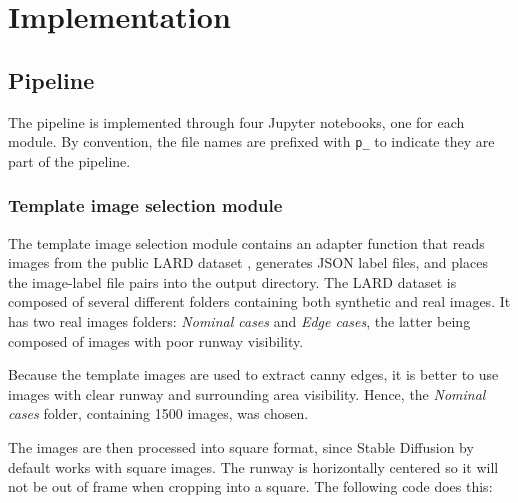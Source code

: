 \chapter{Implementation}




% 


\section{Pipeline}

The pipeline is implemented through four Jupyter notebooks, one for each module.
By convention, the file names are prefixed with \texttt{p\_} to indicate they are part of the pipeline.

\subsection{Template image selection module}

The template image selection module contains an adapter function that reads images from the public LARD dataset \cite{ducoffe_lard_2023}, generates JSON label files, and places the image-label file pairs into the output directory. 
The LARD dataset is composed of several different folders containing both synthetic and real images. 
It has two real images folders: \emph{Nominal cases} and \emph{Edge cases}, the latter being composed of images with poor runway visibility.

Because the template images are used to extract canny edges, it is better to use images with clear runway and surrounding area visibility. 
Hence, the \emph{Nominal cases} folder, containing 1500 images, was chosen.

The images are then processed into square format, since Stable Diffusion by
default works with square images. 
The runway is horizontally centered so it will not be out of frame when cropping into a square. 
The following code does this:

